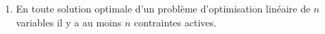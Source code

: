 \begin{enumerate}
\begin{enumerate}



      \item En toute solution optimale d'un problème d'optimisation linéaire de
        $n$ variables il y a au moins $n$  contraintes actives.













    \end{enumerate}


\end{enumerate}
